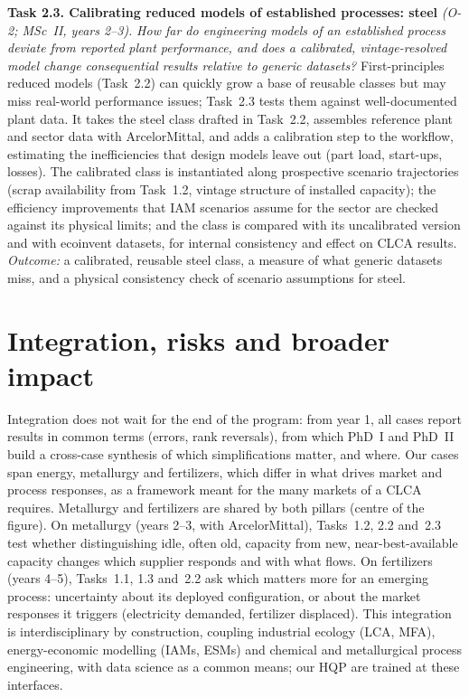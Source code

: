 \documentclass[compact]{nserc} %
\begin{document}
\noindent \textbf{Task 2.3. Calibrating reduced models of established processes: steel} \emph{(O-2; MSc~II, years 2--3).} \emph{How far do engineering models of an established process deviate from reported plant performance, and does a calibrated, vintage-resolved model change consequential results relative to generic datasets?} %
%
First-principles reduced models (Task~2.2) can quickly grow a base of reusable classes but may miss real-world performance issues; Task~2.3 tests them against well-documented plant data. It takes the steel class drafted in Task~2.2, assembles reference plant and sector data with ArcelorMittal, and adds a calibration step to the workflow, estimating the inefficiencies that design models leave out (part load, start-ups, losses). The calibrated class is instantiated along prospective scenario trajectories (scrap availability from Task~1.2, vintage structure of installed capacity); the efficiency improvements that IAM scenarios assume for the sector are checked against its physical limits; and the class is compared with its uncalibrated version and with ecoinvent datasets, for internal consistency and effect on CLCA results. \emph{Outcome:} a calibrated, reusable steel class, a measure of what generic datasets miss, and a physical consistency check of scenario assumptions for steel.

\section{Integration, risks and broader impact}

Integration does not wait for the end of the program: from year 1, all cases report results in common terms (errors, rank reversals), from which PhD~I and PhD~II build a cross-case synthesis of which simplifications matter, and where. Our cases span energy, metallurgy and fertilizers, which differ in what drives market and process responses, as a framework meant for the many markets of a CLCA requires. Metallurgy and fertilizers are shared by both pillars (centre of the figure). On metallurgy (years 2--3, with ArcelorMittal), Tasks~1.2, 2.2 and~2.3 test whether distinguishing idle, often old, capacity from new, near-best-available capacity changes which supplier responds and with what flows. On fertilizers (years 4--5), Tasks~1.1, 1.3 and~2.2 ask which matters more for an emerging process: uncertainty about its deployed configuration, or about the market responses it triggers (electricity demanded, fertilizer displaced). This integration is interdisciplinary by construction, coupling industrial ecology (LCA, MFA), energy-economic modelling (IAMs, ESMs) and chemical and metallurgical process engineering, with data science as a common means; our HQP are trained at these interfaces.
\end{document}
